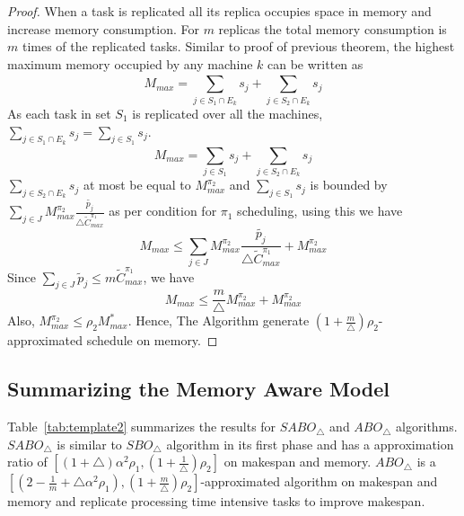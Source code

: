 \documentclass[twocolumn]{svjour3}
\begin{document}
\begin{proof}           
  When a task is replicated all its replica occupies space in memory
  and increase memory consumption. For $m$ replicas the total memory
  consumption is $m$ times of the replicated tasks. Similar to proof
  of previous theorem, the highest maximum memory occupied by any
  machine $k$ can be written as
  \begin{equation}\nonumber
    M_{max}= \sum_{j \in S_1\cap E_k}^{}s_j+\sum_{j \in S_2\cap E_k}^{}s_j           
  \end{equation}
  As each task in set $S_1$ is replicated over all the
  machines,$\sum\limits _{j \in S_1\cap E_k}^{}s_j =\sum\limits _{j
    \in S_1}^{}s_j$.
  \begin{equation}\nonumber
    M_{max} = \sum_{j\in S_1}^{}s_j+\sum_{j \in S_2\cap E_k}^{}s_j           
  \end{equation}    
  $\sum\limits_{j \in S_2\cap E_k}^{}s_j$ at most be equal to
  $M^{\pi_2}_{max} $ and $\sum\limits_{j\in S_1}s_j$ is bounded by
  $\sum\limits_{j \in J}^{} {M^{\pi_2}_{max}}
  \frac{\tilde{p_j}}{\triangle \tilde{C}^{\pi_1}_{max}} $ as per
  condition for $\pi_1$ scheduling, using this we have
  \begin{equation}\nonumber
    M_{max}\leq \sum_{j \in J}^{} {M^{\pi_2}_{max}} \frac{\tilde{p_j}}{\triangle \tilde{C}^{\pi_1}_{max}}+{M^{\pi_2}_{max}}
  \end{equation}
  Since $ \sum\limits_{j \in J}\tilde{p}_j \leq m\tilde{C}^{\pi_1}_{max} $, we have 
  \begin{equation}\nonumber
    M_{max}\leq   \frac{m}{\triangle}{M^{\pi_2}_{max}}+{M^{\pi_2}_{max}}
  \end{equation}
  Also,  ${M^{\pi_2}_{max}} \leq \rho_2 {M^{*}_{max}}$.  Hence, The Algorithm generate $ (1+\frac{m}{\triangle})\rho_2 $- approximated schedule on memory.
\end{proof}
                  
\subsection{Summarizing the Memory Aware Model}
Table~\ref{tab:template2} summarizes the results for $SABO_\triangle$
and $ABO_\triangle$ algorithms. $SABO_\triangle$ is similar to $
SBO_\triangle$ algorithm in its first phase and has a approximation
ratio of $[(1+\triangle)\alpha^2 \rho_1,
(1+\frac{1}{\triangle})\rho_2]$ on makespan and memory.
$ABO_\triangle$ is a $ [(2-\frac{1}{m}+\triangle\alpha^2 \rho_1),
(1+\frac{m}{\triangle})\rho_2] $-approximated algorithm on makespan
and memory and replicate processing time intensive tasks to improve
makespan.
     
\end{document}
